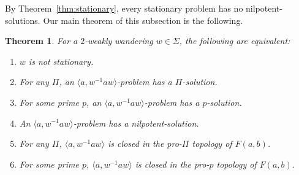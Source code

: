 \documentclass[10pt,a4paper]{amsart}
\newtheorem{theorem}{Theorem}[section]
\theoremstyle{definition}
\theoremstyle{definition}
\numberwithin{equation}{section}
\begin{document}
By Theorem~\ref{thm:stationary}, every stationary problem has no nilpotent-solutions. Our main theorem of this subsection is the following.


\begin{theorem}\label{thm:2ww} For a  $2$-weakly wandering $w\in\Sigma$, the following are equivalent:
\begin{enumerate}
\item[(i)] $w$ is not stationary.
\item[(ii)] For any $\Pi$, an $\langle a, w^{-1}aw\rangle$-problem has a $\Pi$-solution.
\item[(iii)] For some prime $p$, an $\langle a, w^{-1}aw\rangle$-problem has a $p$-solution.
\item[(iv)] An $\langle a, w^{-1}aw\rangle$-problem has a nilpotent-solution.
\item[(v)] For any $\Pi$, $\langle a, w^{-1}aw\rangle$ is closed in the pro-$\Pi$ topology of $F(a, b)$.
\item[(vi)] For some prime $p$, $\langle a, w^{-1}aw\rangle$ is closed in the pro-$p$ topology of $F(a, b)$.
\end{enumerate}
\end{theorem}
\end{document}
